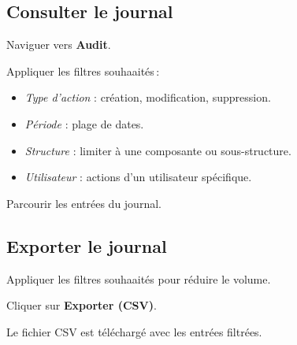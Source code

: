 \subsection{Consulter le journal}

\begin{steps}
  \item Naviguer vers \textbf{Audit}.
  \item Appliquer les filtres souhaait\'es\,:
    \begin{itemize}
      \item \textit{Type d'action} : cr\'eation, modification, suppression.
      \item \textit{P\'eriode} : plage de dates.
      \item \textit{Structure} : limiter \`a une composante ou sous-structure.
      \item \textit{Utilisateur} : actions d'un utilisateur sp\'ecifique.
    \end{itemize}
  \item Parcourir les entr\'ees du journal.
\end{steps}

\subsection{Exporter le journal}

\begin{steps}
  \item Appliquer les filtres souhaait\'es pour r\'eduire le volume.
  \item Cliquer sur \textbf{Exporter (CSV)}.
  \item Le fichier CSV est t\'el\'echarg\'e avec les entr\'ees filtr\'ees.
\end{steps}
